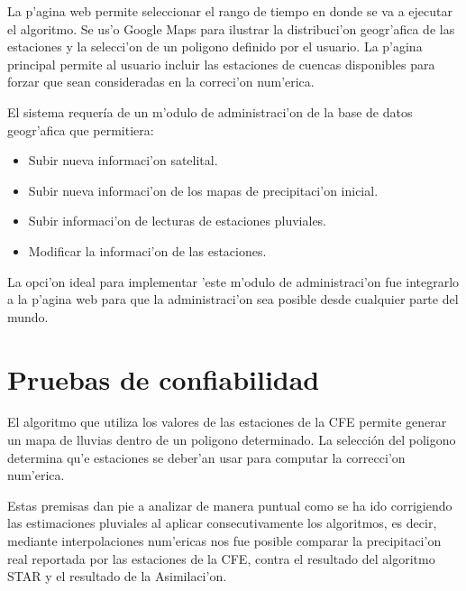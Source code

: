 La p'agina web permite seleccionar el rango de tiempo en donde se va a ejecutar el algoritmo. Se us'o Google Maps
para ilustrar la distribuci'on geogr'afica de las estaciones y la selecci'on de un poligono definido por el usuario.
La p'agina principal permite al usuario incluir las estaciones de cuencas disponibles para forzar que 
sean consideradas en la correci'on num'erica. 

El sistema requería de un m'odulo de administraci'on de la base de datos geogr'afica que permitiera:
\begin{itemize}
 \item Subir nueva informaci'on satelital.
  \item Subir nueva informaci'on de los mapas de precipitaci'on inicial.
  \item Subir informaci'on de lecturas de estaciones pluviales.
  \item Modificar la informaci'on de las estaciones.
\end{itemize}

La opci'on ideal para implementar 'este m'odulo de administraci'on fue integrarlo a la p'agina web
para que la administraci'on sea posible desde cualquier parte del mundo.


\section{Pruebas de confiabilidad}
El algoritmo que utiliza los valores de las estaciones de la CFE permite generar un mapa de lluvias dentro de un poligono
determinado. La selección del poligono determina qu'e estaciones se deber'an usar para computar la correcci'on num'erica.

Estas premisas dan pie a analizar de manera puntual como se ha ido corrigiendo las estimaciones pluviales al aplicar
consecutivamente los algoritmos, es decir, mediante interpolaciones num'ericas nos fue posible comparar la precipitaci'on
real reportada por las estaciones de la CFE, contra el resultado del algoritmo STAR y el resultado de la Asimilaci'on.

